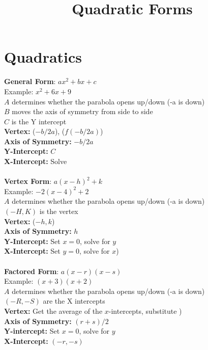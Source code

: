 \documentclass{article}
\begin{document}
	
	\setlength{\droptitle}{-5em}
	\title{Quadratic Forms}
	\date{}
	\author{}
	\maketitle
	
	\section*{Quadratics}
	\textbf{General Form}: $ax^2 + bx + c$ \\
	Example: $x^2 + 6x + 9$ \\
	\textbf{$A$} determines whether the parabola opens up/down (-a is down)\\
	\textbf{$B$} moves the axis of symmetry from side to side\\
	\textbf{$C$} is the Y intercept\\ 
	\textbf{Vertex:} ($-b/2a$), ($f(-b/2a)$)\\
	\textbf{Axis of Symmetry:} $-b/2a$ \\
	\textbf{Y-Intercept:} $C$\\
	\textbf{X-Intercept:} Solve\\ \\
	\textbf{Vertex Form}: $a(x-h)^2+k$ \\
	Example: $-2(x-4)^{2}+2$\\
	$A$ determines whether the parabola opens up/down (-a is down) \\
	$(-H, K)$ is the vertex \\ 
	\textbf{Vertex:} ($-h, k$) \\
	\textbf{Axis of Symmetry:} $h$ \\
	\textbf{Y-Intercept:} Set $x=0$, solve for $y$\\
	\textbf{X-Intercept:} Set $y=0$, solve for $x$)\\ \\
	\textbf{Factored Form}: $a(x-r)(x-s)$ \\
	Example: $(x+3)(x+2)$ \\
	$A$ determines whether the parabola opens up/down (-a is down) \\
	$(-R, -S)$ are the X intercepts \\ 
	\textbf{Vertex:} Get the average of the $x$-intercepts, substitute )\\
	\textbf{Axis of Symmetry:} $(r+s)/2$\\
	\textbf{Y-intercept:} Set $x=0$, solve for $y$ \\
	\textbf{X-Intercept:} $(-r, -s)$  \\
\end{document}
